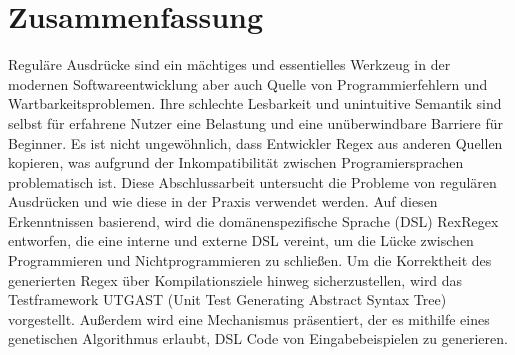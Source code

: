 
\section*{Zusammenfassung}

Reguläre Ausdrücke sind ein mächtiges und essentielles Werkzeug in der modernen Softwareentwicklung aber auch Quelle von Programmierfehlern und Wartbarkeitsproblemen. Ihre schlechte Lesbarkeit und unintuitive Semantik sind selbst für erfahrene Nutzer eine Belastung und eine unüberwindbare Barriere für Beginner. Es ist nicht ungewöhnlich, dass Entwickler Regex aus anderen Quellen kopieren, was aufgrund der Inkompatibilität zwischen Programiersprachen problematisch ist. Diese Abschlussarbeit untersucht die Probleme von regulären Ausdrücken und wie diese in der Praxis verwendet werden. Auf diesen Erkenntnissen basierend, wird die domänenspezifische Sprache (DSL) RexRegex entworfen, die eine interne und externe DSL vereint, um die Lücke zwischen Programmieren und Nichtprogrammieren zu schließen. Um die Korrektheit des generierten Regex über Kompilationsziele hinweg sicherzustellen, wird das Testframework UTGAST (Unit Test Generating Abstract Syntax Tree) vorgestellt. Außerdem wird eine Mechanismus präsentiert, der es mithilfe eines genetischen Algorithmus erlaubt, DSL Code von Eingabebeispielen zu generieren.
